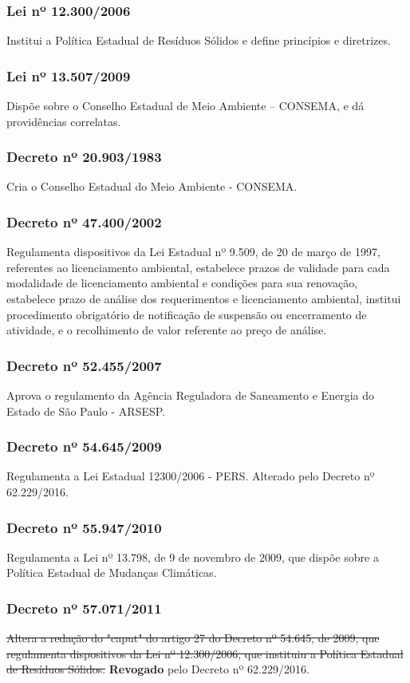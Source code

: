\begin{subapend}
\begin{subsubapend}
		\subsubsection{Lei nº 12.300/2006}
		Institui a Política Estadual de Resíduos Sólidos e define princípios e diretrizes.
		\subsubsection{Lei nº 13.507/2009}
		Dispõe sobre o Conselho Estadual de Meio Ambiente – CONSEMA, e dá providências correlatas.
		\subsubsection{Decreto nº 20.903/1983}
		Cria o Conselho Estadual do Meio Ambiente - CONSEMA.
		\subsubsection{Decreto nº 47.400/2002}
		Regulamenta dispositivos da Lei Estadual nº 9.509, de 20 de março de 1997, referentes ao licenciamento ambiental, estabelece prazos de validade para cada modalidade de licenciamento ambiental e condições para sua renovação, estabelece prazo de análise dos requerimentos e licenciamento ambiental, institui procedimento obrigatório de notificação de suspensão ou encerramento de atividade, e o recolhimento de valor referente ao preço de análise.
		\subsubsection{Decreto nº 52.455/2007}
		Aprova o regulamento da Agência Reguladora de Saneamento e Energia do Estado de São Paulo - ARSESP.
		\subsubsection{Decreto nº 54.645/2009}
		Regulamenta a Lei Estadual 12300/2006 - PERS. Alterado pelo Decreto nº 62.229/2016.
		\subsubsection{Decreto nº 55.947/2010}
		Regulamenta a Lei nº 13.798, de 9 de novembro de 2009, que dispõe sobre a Política Estadual de Mudanças Climáticas.
		\subsubsection{Decreto nº 57.071/2011}
		\sout{Altera a redação do "caput" do artigo 27 do Decreto nº 54.645, de 2009, que regulamenta dispositivos da Lei nº 12.300/2006, que instituiu a Política Estadual de Resíduos Sólidos.} \textbf{Revogado} pelo Decreto nº 62.229/2016.

\end{subsubapend}
\end{subapend}
